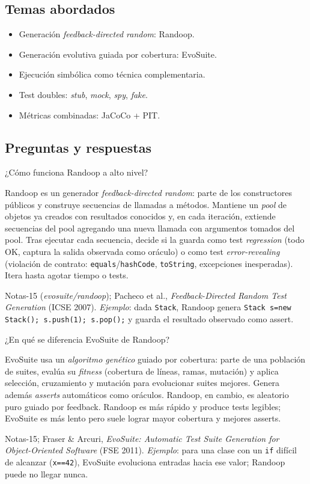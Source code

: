 \documentclass[11pt,a4paper]{article}
\newcounter{preg}
\newcommand{\qa}[3]{%
  \stepcounter{preg}%
  \vspace{0.4em}
  \begin{preguntabox}{\thepreg}
  #1
  \end{preguntabox}
  \begin{respuestabox}
  #2
  \end{respuestabox}
  \begin{refbox}
  #3
  \end{refbox}
  \vspace{0.6em}
}
\begin{document}
\subsection*{Temas abordados}
\begin{itemize}[leftmargin=1.4em]
  \item Generación \emph{feedback-directed random}: Randoop.
  \item Generación evolutiva guiada por cobertura: EvoSuite.
  \item Ejecución simbólica como técnica complementaria.
  \item Test doubles: \emph{stub}, \emph{mock}, \emph{spy}, \emph{fake}.
  \item Métricas combinadas: JaCoCo + PIT.
\end{itemize}

\subsection*{Preguntas y respuestas}

\qa{¿Cómo funciona Randoop a alto nivel?}
{Randoop es un generador \emph{feedback-directed random}: parte de los constructores públicos y construye secuencias de llamadas a métodos. Mantiene un \emph{pool} de objetos ya creados con resultados conocidos y, en cada iteración, extiende secuencias del pool agregando una nueva llamada con argumentos tomados del pool. Tras ejecutar cada secuencia, decide si la guarda como test \emph{regression} (todo OK, captura la salida observada como oráculo) o como test \emph{error-revealing} (violación de contrato: \texttt{equals}/\texttt{hashCode}, \texttt{toString}, excepciones inesperadas). Itera hasta agotar tiempo o tests.}
{Notas-15 (\emph{evosuite/randoop}); Pacheco et al., \emph{Feedback-Directed Random Test Generation} (ICSE 2007). \emph{Ejemplo}: dada \texttt{Stack}, Randoop genera \texttt{Stack s=new Stack(); s.push(1); s.pop();} y guarda el resultado observado como assert.}

\qa{¿En qué se diferencia EvoSuite de Randoop?}
{EvoSuite usa un \emph{algoritmo genético} guiado por cobertura: parte de una población de suites, evalúa su \emph{fitness} (cobertura de líneas, ramas, mutación) y aplica selección, cruzamiento y mutación para evolucionar suites mejores. Genera además \emph{asserts} automáticos como oráculos. Randoop, en cambio, es aleatorio puro guiado por feedback. Randoop es más rápido y produce tests legibles; EvoSuite es más lento pero suele lograr mayor cobertura y mejores asserts.}
{Notas-15; Fraser \& Arcuri, \emph{EvoSuite: Automatic Test Suite Generation for Object-Oriented Software} (FSE 2011). \emph{Ejemplo}: para una clase con un \texttt{if} difícil de alcanzar (\texttt{x==42}), EvoSuite evoluciona entradas hacia ese valor; Randoop puede no llegar nunca.}
\end{document}
